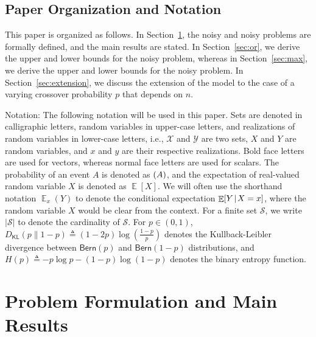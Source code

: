 \documentclass[journal, onecolumn]{IEEEtran}
\theoremstyle{plain}
\theoremstyle{definition}
\theoremstyle{remark}
\def\cs{{\mathcal S}}
\def\cx{{\mathcal X}}
\def\cy{{\mathcal Y}}
\DeclareMathOperator\E{\mathbb{E}}
\let\P\relax
\DeclareMathOperator\P{\mathsf{P}}
\def\DKL{{D_\mathsf{KL}(p\|1-p)}}
\newcommand{\cond}{\mathchoice{\,\vert\,}{\mspace{2mu}\vert\mspace{2mu}}{\vert}{\vert}}
\begin{document}
\subsection{Paper Organization and Notation}
This paper is organized as follows. In Section~\ref{sec:problem}, the noisy \orn and noisy \maxn problems are formally defined, and the main results are stated. In Section~\ref{sec:or}, we derive the upper and lower bounds for the noisy \orn problem, whereas in Section~\ref{sec:max}, we derive the upper and lower bounds for the noisy \maxn problem. In Section~\ref{sec:extension}, we discuss the extension of the model to the case of a varying crossover probability $p$ that depends on $n$.



Notation: The following notation will be used in this paper. Sets are denoted in calligraphic letters, random variables in upper-case letters, and realizations of random variables in lower-case letters, i.e., $\cx$ and $\cy$ are two sets, $X$ and $Y$ are random variables, and $x$ and $y$ are their respective realizations. Bold face letters are used for vectors, whereas normal face letters are used for scalars. The probability of an event $A$ is denoted as $\P(A)$, and the expectation of real-valued random variable $X$ is denoted as $\E[X]$. We will often use the shorthand notation $\E_x(Y)$ to denote the conditional expectation $\E[Y \cond X = x]$, where the random variable $X$ would be clear from the context. For a finite set $\cs$, we write $|\cs|$ to denote the cardinality of $\cs$. For $p \in (0,1)$, $\DKL \triangleq (1-2p)\log\left(\frac{1-p}{p}\right)$ denotes the Kullback-Leibler divergence between $\mathsf{Bern}(p)$ and $\mathsf{Bern}(1-p)$ distributions, and $H(p)\triangleq -p\log p-(1-p)\log (1-p)$ denotes the binary entropy function.





\section{Problem Formulation and Main Results} \label{sec:problem}
\end{document}
